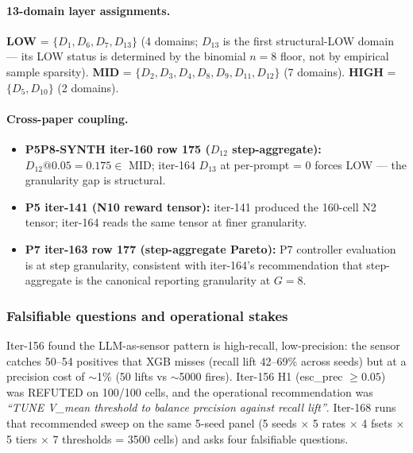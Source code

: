 \documentclass{article}
\begin{document}
\paragraph{13-domain layer assignments.}
\textbf{LOW} = $\{D_1, D_6, D_7, D_{13}\}$ (4 domains; $D_{13}$ is the
first structural-LOW domain — its LOW status is determined by the
binomial $n=8$ floor, not by empirical sample sparsity).
\textbf{MID} = $\{D_2, D_3, D_4, D_8, D_9, D_{11}, D_{12}\}$ (7 domains).
\textbf{HIGH} = $\{D_5, D_{10}\}$ (2 domains).

\paragraph{Cross-paper coupling.}
\begin{itemize}
\item \textbf{P5P8-SYNTH iter-160 row 175 ($D_{12}$ step-aggregate):}
$D_{12}@0.05 = 0.175 \in$ MID; iter-164 $D_{13}$ at per-prompt = 0
forces LOW — the granularity gap is structural.
\item \textbf{P5 iter-141 (N10 reward tensor):} iter-141 produced the
160-cell N2 tensor; iter-164 reads the same tensor at finer granularity.
\item \textbf{P7 iter-163 row 177 (step-aggregate Pareto):} P7 controller
evaluation is at step granularity, consistent with iter-164's
recommendation that step-aggregate is the canonical reporting granularity
at $G=8$.
\end{itemize} 

\subsubsection{Falsifiable questions and operational stakes}
Iter-156 found the LLM-as-sensor pattern is high-recall, low-precision:
the sensor catches 50--54 positives that XGB misses (recall lift
42--69\% across seeds) but at a precision cost of $\sim$1\% (50 lifts
vs $\sim$5000 fires). Iter-156 H1 (esc\_prec $\geq 0.05$) was REFUTED
on 100/100 cells, and the operational recommendation was
\emph{``TUNE V\_mean threshold to balance precision against recall
lift''}. Iter-168 runs that recommended sweep on the same 5-seed panel
(5 seeds $\times$ 5 rates $\times$ 4 fsets $\times$ 5 tiers $\times$
7 thresholds = 3500 cells) and asks four falsifiable questions.
\end{document}
